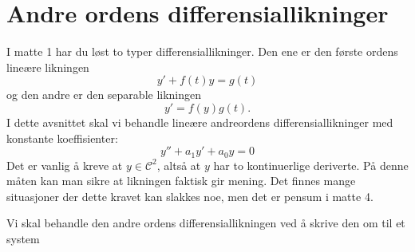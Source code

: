 

\label{ch:andre-ordens-lineare-differensiallikninger}


\section*{Andre ordens differensiallikninger}
I matte 1 har du løst to typer differensiallikninger. Den ene er den første ordens lineære likningen
\[
y'+f(t)y=g(t)
\]
og den andre er den separable likningen
\[
y'=f(y)g(t).
\]
I dette avsnittet skal vi behandle lineære andreordens differensiallikninger med konstante koeffisienter:
\[
y''+a_1y'+a_0y=0
\]
Det er vanlig å kreve at $y \in \mathcal C^2$, altså at $y$ har to kontinuerlige deriverte. 
På denne måten kan man sikre at likningen faktisk gir mening. 
Det finnes mange situasjoner der dette kravet kan slakkes noe, 
men det er pensum i matte 4.  

Vi skal behandle den andre ordens differensiallikningen ved å skrive den om til et system 







